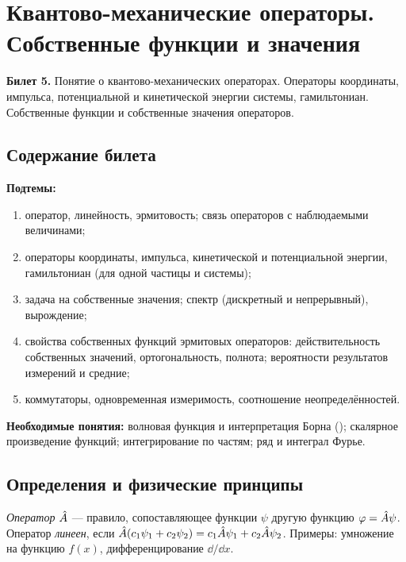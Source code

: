 \chapter[Операторы. Собственные функции и собственные значения]%
        {Квантово-механические операторы. Собственные функции и значения}
\label{t:05}

\begin{qbox}
\textbf{Билет 5.} Понятие о квантово-механических операторах. Операторы координаты,
импульса, потенциальной и кинетической энергии системы, гамильтониан. Собственные функции и
собственные значения операторов.
\end{qbox}

\section{Содержание билета}

\textbf{Подтемы:}
\begin{enumerate}
 \item оператор, линейность, эрмитовость; связь операторов с наблюдаемыми величинами;
 \item операторы координаты, импульса, кинетической и потенциальной энергии, гамильтониан (для одной частицы и системы);
 \item задача на собственные значения; спектр (дискретный и непрерывный), вырождение;
 \item свойства собственных функций эрмитовых операторов: действительность собственных значений,
       ортогональность, полнота; вероятности результатов измерений и средние;
 \item коммутаторы, одновременная измеримость, соотношение неопределённостей.
\end{enumerate}

\textbf{Необходимые понятия:} волновая функция и интерпретация Борна ();
скалярное произведение функций; интегрирование по частям; ряд и интеграл Фурье.

\section{Определения и физические принципы}

\begin{definition}[оператор]
\emph{Оператор} $\hat{A}$ — правило, сопоставляющее функции $\psi$ другую функцию $\varphi=\hat{A}\psi$.
Оператор \emph{линеен}, если $\hat{A}(c_1\psi_1+c_2\psi_2)=c_1\hat{A}\psi_1+c_2\hat{A}\psi_2$.
Примеры: умножение на функцию $f(x)$, дифференцирование $\dd/\dd x$.
\end{definition}

